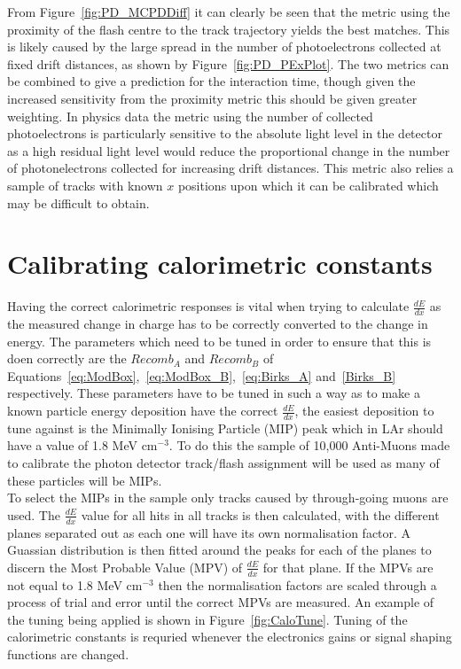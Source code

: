 From Figure~\ref{fig:PD_MCPDDiff} it can clearly be seen that the metric using the proximity of the flash centre to the track trajectory yields the best matches. This is likely caused by the large spread in the number of photoelectrons collected at fixed drift distances, as shown by Figure~\ref{fig:PD_PExPlot}. The two metrics can be combined to give a prediction for the interaction time, though given the increased sensitivity from the proximity metric this should be given greater weighting. In physics data the metric using the number of collected photoelectrons is particularly sensitive to the absolute light level in the detector as a high residual light level would reduce the proportional change in the number of photonelectrons collected for increasing drift distances. This metric also relies a sample of tracks with known $x$ positions upon which it can be calibrated which may be difficult to obtain. \\



\section{Calibrating calorimetric constants} \label{sec:MCCalib} %
Having the correct calorimetric responses is vital when trying to calculate $\frac{dE}{dx}$ as the measured change in charge has to be correctly converted to the change in energy. The parameters which need to be tuned in order to ensure that this is doen correctly are the $Recomb_A$ and $Recomb_B$ of Equations~\ref{eq:ModBox},~\ref{eq:ModBox_B},~\ref{eq:Birks_A} and~\ref{Birks_B} respectively. These parameters have to be tuned in such a way as to make a known particle energy deposition have the correct $\frac{dE}{dx}$, the easiest deposition to tune against is the Minimally Ionising Particle (MIP) peak which in LAr should have a value of 1.8 MeV cm$^{-3}$. To do this the sample of 10,000 Anti-Muons made to calibrate the photon detector track/flash assignment will be used as many of these particles will be MIPs. \\

To select the MIPs in the sample only tracks caused by through-going muons are used. The $\frac{dE}{dx}$ value for all hits in all tracks is then calculated, with the different planes separated out as each one will have its own normalisation factor. A Guassian distribution is then fitted around the peaks for each of the planes to discern the Most Probable Value (MPV) of $\frac{dE}{dx}$ for that plane. If the MPVs are not equal to 1.8 MeV cm$^{-3}$ then the normalisation factors are scaled through a process of trial and error until the correct MPVs are measured. An example of the tuning being applied is shown in Figure~\ref{fig:CaloTune}. Tuning of the calorimetric constants is requried whenever the electronics gains or signal shaping functions are changed.

